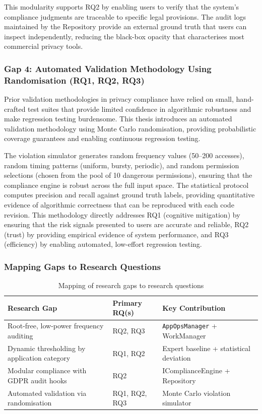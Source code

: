 This modularity supports RQ2 by enabling users to verify that the system's compliance judgments are traceable to specific legal provisions. The audit logs maintained by the Repository provide an external ground truth that users can inspect independently, reducing the black-box opacity that characterises most commercial privacy tools.

\subsubsection{Gap 4: Automated Validation Methodology Using Randomisation (RQ1, RQ2, RQ3)}
Prior validation methodologies in privacy compliance have relied on small, hand-crafted test suites that provide limited confidence in algorithmic robustness and make regression testing burdensome. This thesis introduces an automated validation methodology using Monte Carlo randomisation, providing probabilistic coverage guarantees and enabling continuous regression testing.

The violation simulator generates random frequency values (50–200 accesses), random timing patterns (uniform, bursty, periodic), and random permission selections (chosen from the pool of 10 dangerous permissions), ensuring that the compliance engine is robust across the full input space. The statistical protocol computes precision and recall against ground truth labels, providing quantitative evidence of algorithmic correctness that can be reproduced with each code revision. This methodology directly addresses RQ1 (cognitive mitigation) by ensuring that the risk signals presented to users are accurate and reliable, RQ2 (trust) by providing empirical evidence of system performance, and RQ3 (efficiency) by enabling automated, low-effort regression testing.

\subsubsection{Mapping Gaps to Research Questions}
\begin{table}[H]
\centering
\caption{Mapping of research gaps to research questions}
\begin{tabular}{p{4cm}p{3cm}p{3cm}}
\toprule
\textbf{Research Gap} & \textbf{Primary RQ(s)} & \textbf{Key Contribution} \\
\midrule
Root-free, low-power frequency auditing & RQ2, RQ3 & \texttt{AppOpsManager} + WorkManager \\
Dynamic thresholding by application category & RQ1, RQ2 & Expert baseline + statistical deviation \\
Modular compliance with GDPR audit hooks & RQ2 & IComplianceEngine + Repository \\
Automated validation via randomisation & RQ1, RQ2, RQ3 & Monte Carlo violation simulator \\
\bottomrule
\end{tabular}
\end{table}

